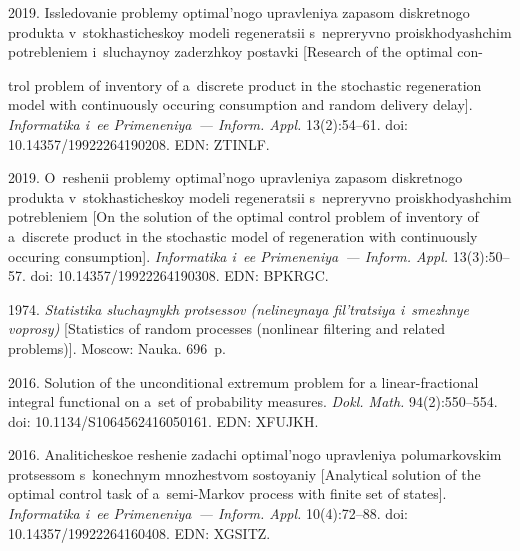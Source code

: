\begin{multicols}{2}
{{\begin{thebibliography}{99}
 2019. Issledovanie problemy optimal'nogo upravleniya zapasom diskretnogo produkta 
 v~stokhasticheskoy modeli regeneratsii s~nep\-re\-ryv\-no proiskhodyashchim potrebleniem i~sluchaynoy za\-derzh\-koy postavki 
 [Research of the optimal con-\linebreak\vspace*{-12pt}
 
 \columnbreak
 
 \noindent
 trol problem of inventory of a~discrete product in the stochastic regeneration model with continuously occuring 
 consumption and random delivery delay]. \textit{Informatika i~ee Primeneniya~--- Inform. Appl.} 13(2):54--61. doi: 10.14357/19922264190208. EDN: ZTINLF.

 2019. O~reshenii problemy optimal'nogo upravleniya zapasom diskretnogo produkta v~stokhasticheskoy modeli regeneratsii 
 s~nepreryvno proiskhodyashchim potrebleniem [On the solution of the optimal control problem of inventory of a~discrete product in the stochastic model 
 of regeneration with continuously occuring consumption]. \textit{Informatika i~ee Primeneniya~--- Inform. Appl.} 13(3):50--57.
doi: 10.14357/19922264190308. EDN: BPKRGC.

 1974. \textit{Statistika sluchaynykh protsessov (nelineynaya fil'tratsiya i~smezhnye voprosy)}
  [Statistics of random processes (nonlinear filtering and related problems)]. Moscow: Nauka. 696~p.

 2016. Solution of the unconditional extremum problem for a linear-fractional integral functional on 
a~set of probability measures. \textit{Dokl. Math.} 94(2):550--554.
doi: 10.1134/S1064562416050161. EDN: XFUJKH.

 2016. Analiticheskoe reshenie zadachi optimal'nogo upravleniya polumarkovskim protsessom 
 s~konechnym mnozhestvom sostoyaniy [Analytical solution of the optimal control task
of a~semi-Markov process with finite set of states]. \textit{Informatika i~ee Primeneniya~--- Inform. \mbox{Appl.}} 10(4):72--88. 
doi: 10.14357/19922264160408. EDN: XGSITZ.

\end{thebibliography}

 }
 }

\end{multicols}


